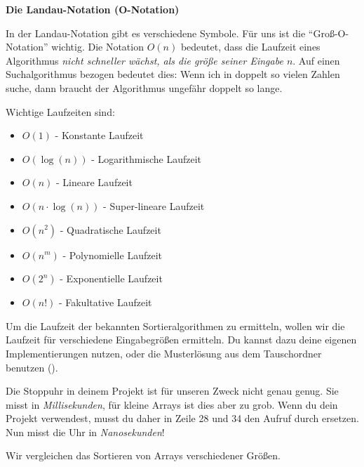\documentclass[11pt, a4paper, ngerman]{arbeitsblatt}
\begin{document}
\ReiheTitel

\begin{infobox}
	\textbf{Die Landau-Notation (O-Notation)}

	In der Landau-Notation gibt es verschiedene Symbole. Für uns ist die
	\enquote{Groß-O-Notation} wichtig. Die Notation $O(n)$ bedeutet,
	dass die Laufzeit eines Algorithmus \emph{nicht schneller wächst, als die größe
	seiner Eingabe $n$}. Auf einen Suchalgorithmus bezogen
	bedeutet dies: Wenn ich in doppelt so vielen Zahlen suche, dann braucht der
	Algorithmus ungefähr doppelt so lange.

	\smallskip
	Wichtige Laufzeiten sind:\vspace{-1ex}
	\begin{multicols}{2}
		\begin{itemize}
			\item $O(1)$ - Konstante Laufzeit
			\item $O(\log(n))$ - Logarithmische Laufzeit
			\item $O(n)$ - Lineare Laufzeit
			\item $O(n\cdot\log(n))$ - Super-lineare Laufzeit
			\item $O(n^2)$ - Quadratische Laufzeit
			\item $O(n^m)$ - Polynomielle Laufzeit
			\item $O(2^n)$ - Exponentielle Laufzeit
			\item $O(n!)$ - Fakultative Laufzeit
		\end{itemize}
	\end{multicols}
	\smallskip
\end{infobox}

Um die Laufzeit der bekannten Sortieralgorithmen zu ermitteln, wollen wir die
Laufzeit für verschiedene Eingabegrößen ermitteln. Du kannst dazu deine eigenen
Implementierungen nutzen, oder die Musterlösung aus dem Tauschordner benutzen
().

\begin{rahmen}{\Large\faStopwatch}
	Die Stoppuhr in deinem Projekt ist für unseren Zweck
	nicht genau genug. Sie misst in \emph{Millisekunden}, für kleine Arrays ist
	dies aber zu grob. Wenn du dein Projekt verwendest, musst du daher in Zeile 28
	und 34 den Aufruf  durch  ersetzen.
	Nun misst die Uhr in \emph{Nanosekunden}!
\end{rahmen}

Wir vergleichen das Sortieren von Arrays verschiedener Größen.
\end{document}
